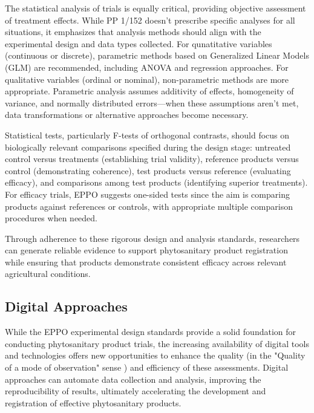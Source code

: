 \documentclass[12pt,a4paper,oneside]{report}
\begin{document}
The statistical analysis of trials is equally critical, providing objective 
assessment of treatment effects. While PP 1/152 \cite{EPPO_PP1_152} doesn't prescribe 
specific analyses for all situations, it emphasizes that analysis methods should 
align with the experimental design and data types collected. For qunatitative 
variables (continuous or discrete), parametric methods based on Generalized 
Linear Models (GLM) are recommended, including ANOVA and regression approaches. 
For qualitative variables (ordinal or nominal), non-parametric methods are more 
appropriate. Parametric analysis assumes additivity of effects, homogeneity of variance, 
and normally distributed errors—when these assumptions aren't met, data transformations 
or alternative approaches become necessary.

Statistical tests, particularly F-tests of orthogonal 
contrasts, should focus on biologically relevant comparisons specified during the 
design stage: untreated control versus treatments (establishing trial validity), 
reference products versus control (demonstrating coherence), test products versus 
reference (evaluating efficacy), and comparisons among test products (identifying 
superior treatments). For efficacy trials, EPPO suggests one-sided tests since the 
aim is comparing products against references or controls, with appropriate multiple 
comparison procedures when needed.

Through adherence to these rigorous design and analysis standards, researchers can 
generate reliable evidence to support phytosanitary product registration while ensuring 
that products demonstrate consistent efficacy across relevant agricultural conditions.

\subsection{Digital Approaches}

While the EPPO experimental design standards provide a solid foundation for conducting
phytosanitary product trials, the increasing availability of digital tools and technologies
offers new opportunities to enhance the quality (in the "Quality of a mode of observation" sense \cite{EPPO_PP1_152}) 
and efficiency of these assessments.
Digital approaches can automate data collection and analysis, improving the
reproducibility of results, ultimately accelerating the development and registration of
effective phytosanitary products.
\end{document}
